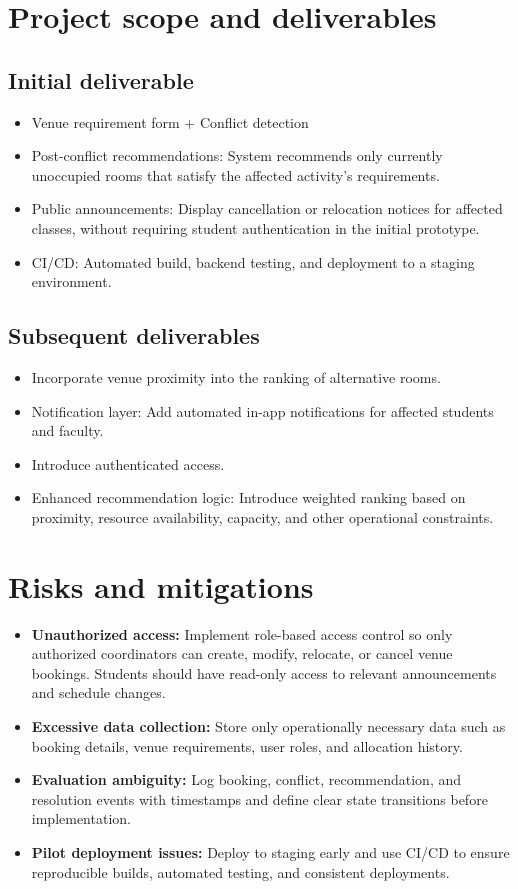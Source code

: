 \documentclass[11pt,a4paper]{article}
\begin{document}
\section{Project scope and deliverables }
\subsection{Initial deliverable }
\begin{itemize}[leftmargin=0.7cm]
    \item Venue requirement form + Conflict detection
    \item Post-conflict recommendations: System recommends only currently unoccupied rooms that satisfy the affected activity's requirements.
    \item Public announcements: Display cancellation or relocation notices for affected classes, without requiring student authentication in the initial prototype.
    \item CI/CD: Automated build, backend testing, and deployment to a staging environment.
\end{itemize}

\subsection{Subsequent deliverables}
\begin{itemize}[leftmargin=0.7cm]
    \item Incorporate venue proximity into the ranking of alternative rooms.
    \item Notification layer: Add automated in-app notifications for affected students and faculty.
    \item Introduce authenticated access.
    \item Enhanced recommendation logic: Introduce weighted ranking based on proximity, resource availability, capacity, and other operational constraints.
\end{itemize}
\section{Risks and mitigations}
\begin{itemize}[leftmargin=0.7cm]
    \item \textbf{Unauthorized access:} Implement role-based access control so only authorized coordinators can create, modify, relocate, or cancel venue bookings. Students should have read-only access to relevant announcements and schedule changes.
    \item \textbf{Excessive data collection:} Store only operationally necessary data such as booking details, venue requirements, user roles, and allocation history.
    \item \textbf{Evaluation ambiguity:} Log booking, conflict, recommendation, and resolution events with timestamps and define clear state transitions before implementation.
    \item \textbf{Pilot deployment issues:} Deploy to staging early and use CI/CD to ensure reproducible builds, automated testing, and consistent deployments.
\end{itemize}
\end{document}
